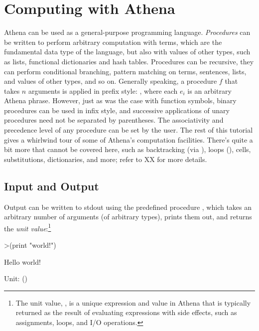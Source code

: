 \section{Computing with Athena}
Athena can be used as a general-purpose programming language. {\em Procedures\/} can be written  to perform arbitrary computation with terms, which are the fundamental data type of the language,
but also with values of other types, such as lists, functional dictionaries and hash tables. Procedures can be recursive, they can perform conditional branching, pattern matching on 
terms, sentences, lists, and values of other types, and so on. Generally speaking, a procedure $f$ that takes $n$ arguments is applied in prefix style: , where each $e_i$
is an arbitrary Athena phrase. However, just as was the case with function symbols, binary procedures can be used in infix style, and successive applications of unary procedures need not
be separated by parentheses. The associativity and precedence level of any procedure can be set by the user. The rest of this tutorial gives a whirlwind tour of some of Athena's 
computation facilities. There's quite a bit more that cannot be covered here, such as backtracking (via ), loops (), cells, substitutions, dictionaries, and more;
refer to XX for more details.

\subsection{Input and Output}
Output can be written to stdout using the predefined procedure , which takes an arbitrary number of  arguments (of arbitrary types), prints them out, 
and returns the {\em unit value}:\footnote{The unit value, \fmtt{()}, is a unique expression and value in Athena that is typically returned as the result 
of evaluating expressions with side effects, such as  assignments,  loops, and I/O operations.}
\begin{tcAthena}[upquote=true]
>(print "\nHello world!\n")

Hello world!

Unit: ()
\end{tcAthena}

